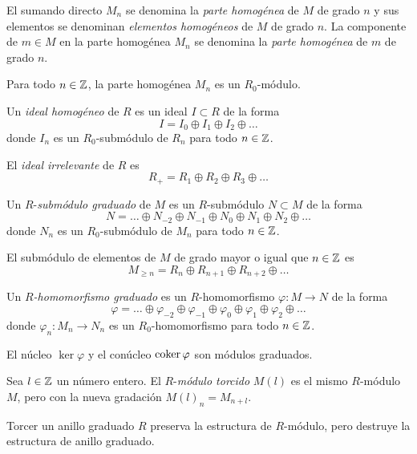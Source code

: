 \begin{definition}
El sumando directo $M_n$ se denomina la \textit{parte homogénea} de $M$ de grado $n$ y sus elementos se denominan \textit{elementos homogéneos} de $M$ de grado $n$. La componente de $m \in M$ en la parte homogénea $M_n$ se denomina la \textit{parte homogénea} de $m$ de grado $n$.
\end{definition}

\begin{remark}
Para todo $n \in \mathbb Z$, la parte homogénea $M_n$ es un $R_0$-módulo.
\end{remark}

\begin{definition}
Un \textit{ideal homogéneo} de $R$ es un ideal $I \subset R$ de la forma
$$I = I_0 \oplus I_1 \oplus I_2 \oplus \dots$$
donde $I_n$ es un $R_0$-submódulo de $R_n$ para todo $n \in \mathbb Z$.
\end{definition}

\begin{example}
El \textit{ideal irrelevante} de $R$ es
$$R_+ = R_1 \oplus R_2 \oplus R_3 \oplus \dots$$
\end{example}

\begin{definition}
Un $R$-\textit{submódulo graduado} de $M$ es un $R$-submódulo $N \subset M$ de la forma
$$N = \dots \oplus N_{-2} \oplus N_{-1} \oplus N_0 \oplus N_1 \oplus N_2 \oplus \dots$$
donde $N_n$ es un $R_0$-submódulo de $M_n$ para todo $n \in \mathbb Z$.
\end{definition}

\begin{example}
El submódulo de elementos de $M$ de grado mayor o igual que $n \in \mathbb Z$ es
$$M_{\ge n} = R_n \oplus R_{n+1} \oplus R_{n+2} \oplus \dots$$
\end{example}

\begin{definition}
Un \textit{$R$-homomorfismo graduado} es un $R$-homomorfismo $\varphi : M \to N$ de la forma
$$\varphi = \dots \oplus \varphi_{-2} \oplus \varphi_{-1} \oplus \varphi_0 \oplus \varphi_1 \oplus \varphi_2 \oplus \dots$$
donde $\varphi_n : M_n \to N_n$ es un $R_0$-homomorfismo para todo $n \in \mathbb Z$.
\end{definition}

\begin{remark}
El núcleo $\ker \varphi$ y el conúcleo $\operatorname{coker} \varphi$ son módulos graduados.
\end{remark}

\begin{definition}
Sea $l \in \mathbb Z$ un número entero. El $R$-\textit{módulo torcido} $M(l)$ es el mismo $R$-módulo $M$, pero con la nueva gradación $M(l)_n = M_{n+l}$.
\end{definition}

\begin{remark}
Torcer un anillo graduado $R$ preserva la estructura de $R$-módulo, pero destruye la estructura de anillo graduado.
\end{remark}
